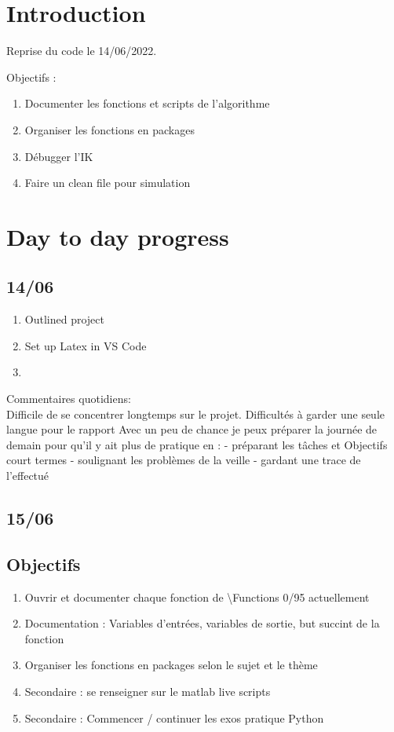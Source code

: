 \documentclass{article}
\begin{document}
\section*{Introduction}

Reprise du code le 14/06/2022.

Objectifs :
\begin{enumerate}
    \item Documenter les fonctions et scripts de l'algorithme
    \item Organiser les fonctions en packages
    \item Débugger l'IK 
    \item Faire un clean file pour  simulation
\end{enumerate}

\section*{Day to day progress}

\subsection*{14/06}

\begin{enumerate}
    \item Outlined project
    \item Set up Latex in VS Code
    \item 
\end{enumerate}

Commentaires quotidiens:\\
Difficile de se concentrer longtemps sur le projet. 
Difficultés à garder une seule langue pour le rapport
Avec un peu de chance je peux préparer la journée de demain pour qu'il y ait plus de pratique en :
- préparant les tâches et Objectifs court termes
- soulignant les problèmes de la veille
- gardant une trace de l'effectué


\subsection*{15/06}

\subsection*{\textbf{Objectifs}}
\begin{enumerate}
    \item Ouvrir et documenter chaque fonction de \textbackslash Functions 0/95 actuellement
    \item Documentation : Variables d'entrées, variables de sortie, but succint de la fonction
    \item Organiser les fonctions en packages selon le sujet et le thème
    \item Secondaire : se renseigner sur le matlab live scripts
    \item Secondaire : Commencer / continuer les exos pratique Python
\end{enumerate}
\end{document}
